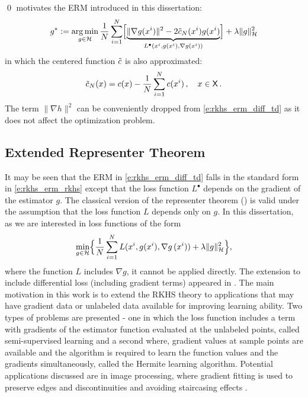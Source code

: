 \qed
{} motivates the ERM introduced in this dissertation:	
\begin{equation}
g^*  := \argmin_{g \in \clH} \frac{1}{N} \sum_{i=1}^N\Bigl[ \underbrace{\| \nabla g(x^i) \|^2 - 2 \tilc_N(x^i)g(x^i)}_{L^\bullet (x^i, g(x^i), \nabla g(x^i))}\Bigr] + \lambda \|g\|^2_\clH
\label{e:rkhs_erm_diff_td}
\end{equation}
in which the centered function $\tilde c$ is also approximated:
\[
\tilc_N(x) = c(x) - \frac{1}{N}  \sum_{i=1}^N  c(x^i)\,,\quad x\in\state\, .
\label{e:rkhs_tilc_N}
\]
The term $\| \nabla h \|^2$ can be conveniently dropped from \eqref{e:rkhs_erm_diff_td} as it does not affect the optimization problem.

\subsection{Extended Representer Theorem}
It may be seen that the ERM in \eqref{e:rkhs_erm_diff_td} falls in the standard form in \eqref{e:rkhs_erm_rkhs} except that the loss function $L^\bullet$ depends on the gradient of the estimator $g$. The classical version of the representer theorem () is valid under the assumption that the loss function $L$ depends only on $g$. In this dissertation, as we are interested in loss functions of the form 
\begin{equation}
\min_{g\in\clH} \Bigl\{  \frac{1}{N} \sum_{i=1}^N L(x^i,  g(x^i), \nabla g\, (x^i))     + \lambda \| g\|^2_{\clH}  \Bigr\},
\label{e:rkhs_erm_rkhs_gradient}
\end{equation}
where the function $L$ includes $\nabla g$, it cannot be applied directly. The extension to include differential loss (including gradient terms) appeared in \cite{zho08}. The main motivation in this work is to extend the RKHS theory to applications that may have gradient data or unlabeled data available for improving learning ability. Two types of problems are presented - one in which the loss function includes a term with gradients of the estimator function evaluated at the unlabeled points, called semi-supervised learning and a second where, gradient values at sample points are available and the algorithm is required to learn the function values and the gradients simultaneously, called the Hermite learning algorithm. Potential applications discussed are in image processing, where gradient fitting is used to preserve edges and discontinuities and avoiding staircasing effects \cite{didsetste09}. 
 
